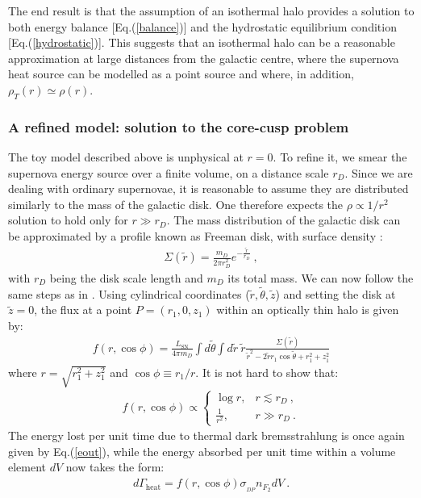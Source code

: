 \documentclass[12pt]{article}
\begin{document}
{{The end result is that the assumption of an isothermal halo provides a solution to both energy balance [Eq.(\ref{balance})] and the hydrostatic equilibrium condition [Eq.(\ref{hydrostatic})]. This suggests that an isothermal halo can be a reasonable approximation at large distances from the galactic centre, where the supernova heat source can be modelled as a point source and where, in addition, $\rho _T (r) \simeq \rho (r)$.

\subsubsection{A refined model: solution to the core-cusp problem}

The toy model described above is unphysical at $r = 0$. To refine it, we smear the supernova energy source over a finite volume, on a distance scale $r_D$. Since we are dealing with ordinary supernovae, it is reasonable to assume they are distributed similarly to the mass of the galactic disk. One therefore expects the $\rho \propto 1/r ^2$ solution to hold only for $r \gg r _D$. The mass distribution of the galactic disk can be approximated by a profile known as Freeman disk, with surface density \cite{freeman}:
%
\begin{eqnarray}
\Sigma (\widetilde{r}) = \frac{m _D}{2\pi r_D ^2}e ^{-\frac{\widetilde{r}}{r_D}} \ ,
\end{eqnarray}
%
with $r_D$ being the disk scale length and $m _D$ its total mass. We can now follow the same steps as in \cite{review}. Using cylindrical coordinates ($\widetilde{r},\widetilde{\theta},\widetilde{z}$) and setting the disk at $\widetilde{z} = 0$, the flux at a point $P = (r _1,0,z _1)$ within an optically thin halo is given by:
%
\begin{eqnarray}
f(r,\cos \phi ) = \frac{L _{\text{SN}}}{4\pi m _D} \int d\widetilde{\theta} \int d\widetilde{r} \ \widetilde{r} \frac{\Sigma (\widetilde{r})}{{\widetilde{r}} ^2 - 2\widetilde{r}r _1 \cos \widetilde{\theta} + r _1 ^2 + z _1 ^2}
\end{eqnarray}
%
where $r = \sqrt{r _1 ^2 + z _1 ^2}$ and $\cos \phi \equiv r _1/r$. It is not hard to show that:
%
\begin{eqnarray}
f(r,\cos \phi) \propto \begin{cases}
                  \log r, & r \lesssim r_D \ , \\
                  \frac{1}{r ^2}, & r \gg r_D \ .
                  \end{cases}
\label{frc}
\end{eqnarray}
%
The energy lost per unit time due to thermal dark bremsstrahlung is once again given by Eq.(\ref{eout}), while the energy absorbed per unit time within a volume element $dV$ now takes the form:
%
\begin{eqnarray}
d\Gamma _{\text{heat}} = f(r,\cos \phi)\sigma _{_{DP}}n _{F _2}dV \ .
\label{ein1}
\end{eqnarray}
%

}}
\end{document}
